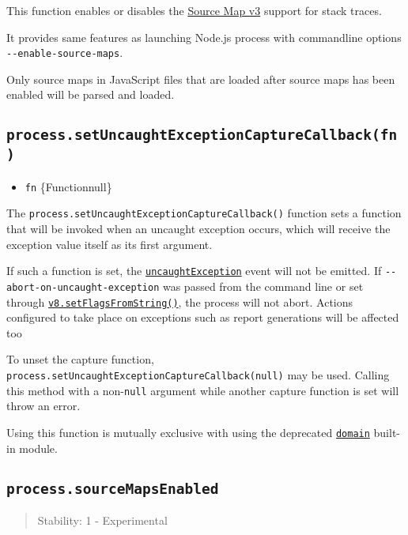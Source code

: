 This function enables or disables the
\href{https://sourcemaps.info/spec.html}{Source Map v3} support for
stack traces.

It provides same features as launching Node.js process with commandline
options \texttt{-\/-enable-source-maps}.

Only source maps in JavaScript files that are loaded after source maps
has been enabled will be parsed and loaded.

\subsection{\texorpdfstring{\texttt{process.setUncaughtExceptionCaptureCallback(fn)}}{process.setUncaughtExceptionCaptureCallback(fn)}}\label{process.setuncaughtexceptioncapturecallbackfn}

\begin{itemize}
\tightlist
\item
  \texttt{fn} \{Function\textbar null\}
\end{itemize}

The \texttt{process.setUncaughtExceptionCaptureCallback()} function sets
a function that will be invoked when an uncaught exception occurs, which
will receive the exception value itself as its first argument.

If such a function is set, the
\hyperref[event-uncaughtexception]{\texttt{\textquotesingle{}uncaughtException\textquotesingle{}}}
event will not be emitted. If \texttt{-\/-abort-on-uncaught-exception}
was passed from the command line or set through
\href{v8.md\#v8setflagsfromstringflags}{\texttt{v8.setFlagsFromString()}},
the process will not abort. Actions configured to take place on
exceptions such as report generations will be affected too

To unset the capture function,
\texttt{process.setUncaughtExceptionCaptureCallback(null)} may be used.
Calling this method with a non-\texttt{null} argument while another
capture function is set will throw an error.

Using this function is mutually exclusive with using the deprecated
\href{domain.md}{\texttt{domain}} built-in module.

\subsection{\texorpdfstring{\texttt{process.sourceMapsEnabled}}{process.sourceMapsEnabled}}\label{process.sourcemapsenabled}

\begin{quote}
Stability: 1 - Experimental
\end{quote}

